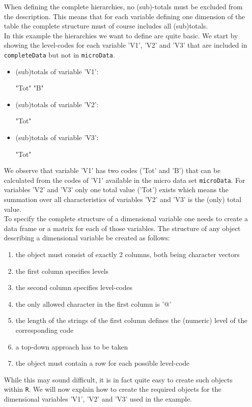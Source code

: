 \documentclass{article}
\begin{document}
When defining the complete hierarchies, no (sub)-totals must be excluded 
from the description. This means that for each variable defining one dimension 
of the table the complete structure must of course includes all (sub)totals. \\

In this example the hierarchies we want to define are quite basic. We start by
showing the level-codes for each variable 'V1', 'V2' and 'V3' that are included
in {\tt completeData} but not in {\tt microData}.
\begin{itemize}
	\item (sub)totals of variable 'V1':
\begin{Schunk}
\begin{Soutput}
[1] "Tot" "B"  
\end{Soutput}
\end{Schunk}
	\item (sub)totals of variable 'V2':
\begin{Schunk}
\begin{Soutput}
[1] "Tot"
\end{Soutput}
\end{Schunk}
	\item (sub)totals of variable 'V3':
\begin{Schunk}
\begin{Soutput}
[1] "Tot"
\end{Soutput}
\end{Schunk}
\end{itemize} 

We observe that variable 'V1' has two codes ('Tot' and 
'B') that can be calculated from the codes of 'V1' available
in the micro data set {\tt microData}. For variables 'V2' and 'V3' only one total
value ('Tot') exists which means the summation over all 
characteristics of variables 'V2' and 'V3' is the (only) total value.  \\

To specify the complete structure of a dimensional variable one needs to create
a data frame or a matrix for each of those variables. The structure of any 
object describing a dimensional variable be created as follows:
\begin{enumerate}
	\item the object must consist of exactly 2 columns, both being character
	vectors
	\item the first column specifies levels
	\item the second column specifies level-codes
	\item the only allowed character in the first column is '@'
	\item the length of the strings of the first column defines the (numeric) level
	of the corresponding code
	\item a top-down approach has to be taken
	\item the object must contain a row for each possible level-code 
\end{enumerate}
While this may sound difficult, it is in fact quite easy to create such objects
within {\tt R}. We will now explain how to create the required objects for the 
dimensional variables 'V1', 'V2' and 'V3' used in the example. 
\end{document}
